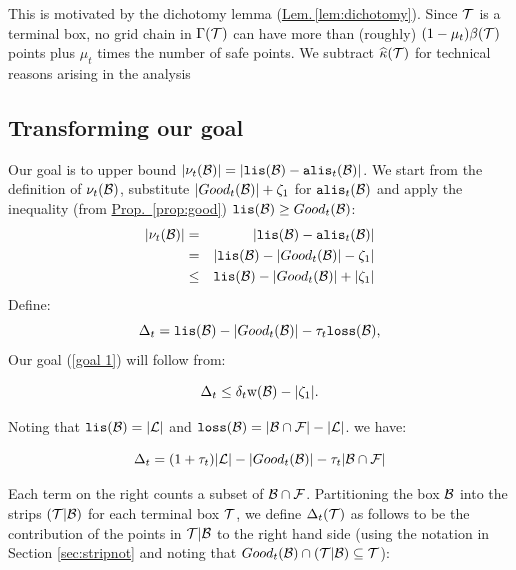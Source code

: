 \documentclass{acmsmall}
\newcommand{\cB}{{\cal B}}
\newcommand{\cF}{{\cal F}}
\newcommand{\cL}{{\cal L}}
\newcommand{\cT}{{\cal T}}
\newcommand{\Lem}[1]{\hyperref[lem:#1]{Lem.\,\ref*{lem:#1}}} %
\newcommand{\Prop}[1]{\hyperref[prop:#1]{Prop.~\ref*{prop:#1}}} %
\newcommand{\lis}{{\tt lis}}
\newcommand{\loss}{{\tt loss}}
\newcommand{\alis}{{\tt alis}}
\newcommand{\Good}{Good}
\newcommand{\kappaest}{\widehat{\kappa}}
\newcommand{\width}{{\bf {\rm  w}}}
\newcommand{\errorterm}{\zeta}
\newcommand{\liserror}{\nu}
\begin{document}
	This is motivated by the dichotomy lemma (\Lem{dichotomy}). Since $\cT$ is a terminal box, no grid chain in $\Gamma(\cT)$ 
	can have more than (roughly) $(1-\mu_t)\beta(\cT)$ points plus $\mu_t$ times the number of safe points.
          We subtract $\kappaest(\cT)$ for technical reasons arising in the analysis
\fi


\subsection{Transforming our goal}
\label{sec:transform}

Our goal is to upper bound $|\nu_t(\cB)|=|\lis(\cB)-\alis_t(\cB)|$.
We start from the definition of $\liserror_t(\cB)$, substitute $|Good_t(\cB)|+ \errorterm_1$ for $\alis_t(\cB)$
and apply the inequality (from \Prop{good}) $\lis(\cB) \geq Good_t(\cB)$:
%
\begin{eqnarray*}
|\liserror_t(\cB)|&=&|\lis(\cB)-\alis_t(\cB)|\\
& = & |\lis(\cB) - |Good_t(\cB)| -\errorterm_1|\\
&\leq & \lis(\cB) - |Good_t(\cB)| + |\errorterm_1|
\end{eqnarray*}
%
%
Define:
\[
\Delta_t=\lis(\cB)-|Good_t(\cB)|-\tau_t\loss(\cB),
\]
Our goal (\ref{goal 1}) will follow from:

\[
\Delta_t \leq \delta_t\width(\cB)-|\errorterm_1|.
\]

Noting that $\lis(\cB)=|\cL|$ and $\loss(\cB)=|\cB \cap \cF|-|\cL|$. we have:

\[
\Delta_t= (1+\tau_t)|\cL|-|Good_t(\cB)|-\tau_t|\cB \cap \cF|
\]

%
Each term on the right counts a subset of $\cB \cap \cF$. Partitioning the box $\cB$ into the strips $(\cT|\cB)$
for each terminal box $\cT$, we define  $\Delta_t(\cT)$ as follows to be the contribution of the points in
$\cT|\cB$ to the right hand side (using the notation in Section \ref{sec:stripnot} 
and noting that $\Good_t(\cB) \cap (\cT|\cB) \subseteq \cT$):
\end{document}
